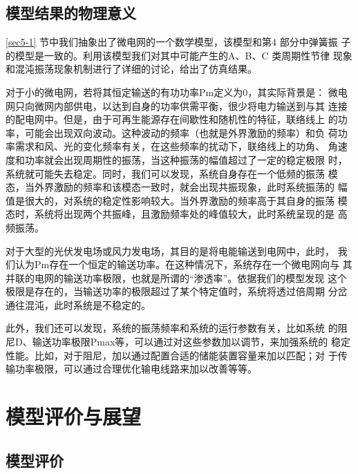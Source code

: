 \documentclass[withoutpreface,bwprint]{cumcmthesis} %
\begin{document}
\subsection{模型结果的物理意义}
\label{sec5-6}

\ref{sec5-1} 节中我们抽象出了微电网的一个数学模型，该模型和第4 部分中弹簧振
子的模型是一致的。利用该模型我们对其中可能产生的A、B、C 类周期性节律
现象和混沌振荡现象机制进行了详细的讨论，给出了仿真结果。

对于小的微电网，若将其恒定输送的有功功率Pm定义为0，其实际背景是：
微电网只向微网内部供电，以达到自身的功率供需平衡，很少将电力输送到与其
连接的配电网中。但是，由于可再生能源存在间歇性和随机性的特征，联络线上
的功率，可能会出现双向波动。这种波动的频率（也就是外界激励的频率）和负
荷功率需求和风、光的变化频率有关，在这些频率的扰动下，联络线上的功角、
角速度和功率就会出现周期性的振荡，当这种振荡的幅值超过了一定的稳定极限
时，系统就可能失去稳定。同时，我们可以发现，系统自身存在一个低频的振荡
模态，当外界激励的频率和该模态一致时，就会出现共振现象，此时系统振荡的
幅值是很大的，对系统的稳定性影响较大。当外界激励的频率高于其自身的振荡
模态时，系统将出现两个共振峰，且激励频率处的峰值较大，此时系统呈现的是
高频振荡。

对于大型的光伏发电场或风力发电场，其目的是将电能输送到电网中，此时，
我们认为Pm存在一个恒定的输送功率。在这种情况下，系统存在一个微电网向与
其并联的电网的输送功率极限，也就是所谓的“渗透率”。依据我们的模型发现
这个极限是存在的，当输送功率的极限超过了某个特定值时，系统将透过倍周期
分岔通往混沌，此时系统是不稳定的。

此外，我们还可以发现，系统的振荡频率和系统的运行参数有关，比如系统
的阻尼D、输送功率极限Pmax等，可以通过对这些参数加以调节，来加强系统的
稳定性能。比如，对于阻尼，加以通过配置合适的储能装置容量来加以匹配；对
于传输功率极限，可以通过合理优化输电线路来加以改善等等。


\section{模型评价与展望}
\label{sec6}

\subsection{模型评价}
\label{sec6-1}
\end{document}
